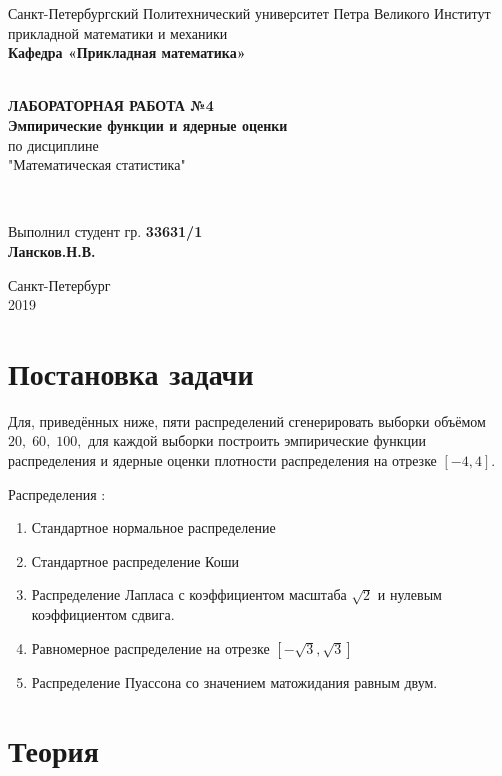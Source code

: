 \documentclass[12pt]{article}
\begin{document}
\begin{titlepage}
	\center
		Санкт-Петербургский Политехнический 
		университет Петра Великого
		Институт прикладной математики и механики
		\\ \textbf{Кафедра «Прикладная математика»}

	\vfill ~
	\textbf{
		\\ \large ЛАБОРАТОРНАЯ РАБОТА №4
		\\	\normalsize	
			Эмпирические функции и ядерные оценки
	}
	\\	по дисциплине 
	\\	"Математическая статистика"

	\vfill ~

	Выполнил студент гр. \textbf{33631/1} \\
	\textbf{Лансков.Н.В.} \\ 

\vfill

{\large}	Санкт-Петербург
\\ 2019
\end{titlepage}

\tableofcontents
\newpage
\listoffigures
\newpage
\pagebreak


\section{Постановка задачи}

Для, приведённых ниже, пяти распределений сгенерировать выборки объёмом $20,\; 60,\; 100,$ для каждой выборки построить эмпирические функции распределения и ядерные оценки плотности распределения на отрезке $[-4, 4].$

Распределения \cite{distr_formulas}:
\begin{enumerate}
\item Стандартное нормальное распределение
\item Стандартное распределение Коши
\item Распределение Лапласа с коэффициентом масштаба $\sqrt{2}$ и нулевым коэффициентом сдвига.
\item Равномерное распределение на отрезке $\left[-\sqrt{3}, \sqrt{3}\right]$
\item Распределение Пуассона со значением матожидания равным двум.
\end{enumerate}

\section{Теория}
\end{document}
